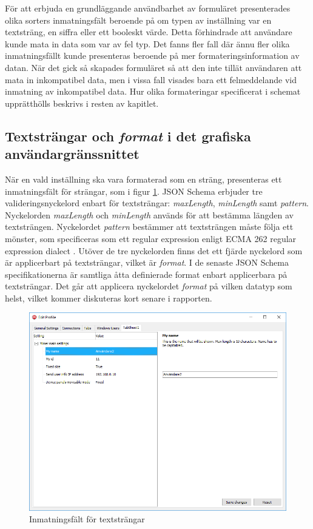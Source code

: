 För att erbjuda en grundläggande användbarhet av formuläret presenterades olika sorters inmatningsfält beroende på om typen av inställning var en textsträng, en siffra eller ett booleskt värde. Detta förhindrade att användare kunde mata in data som var av fel typ. Det fanns fler fall där ännu fler olika inmatningsfällt kunde presenteras beroende på mer formateringsinformation av datan. När det gick så skapades formuläret så att den inte tillät användaren att mata in inkompatibel data, men i vissa fall visades bara ett felmeddelande vid inmatning av inkompatibel data. Hur olika formateringar specificerat i schemat upprätthölls beskrivs i resten av kapitlet.

\subsection{Textsträngar och \textit{format} i det grafiska användargränssnittet}

När en vald inställning ska vara formaterad som en sträng, presenteras ett inmatningsfält för strängar, som i figur \ref{fig:textstrang}. JSON Schema erbjuder tre valideringsnyckelord enbart för textsträngar: \textit{maxLength}, \textit{minLength} samt \textit{pattern}. Nyckelorden \textit{maxLength} och \textit{minLength} används för att bestämma längden av textsträngen. Nyckelordet \textit{pattern} bestämmer att textsträngen måste följa ett mönster, som specificeras som ett regular expression enligt ECMA 262 regular expression dialect \cite{EcmaInternational2017}. Utöver de tre nyckelorden finns det ett fjärde nyckelord som är applicerbart på textsträngar, vilket är \textit{format}. I de senaste JSON Schema specifikationerna är samtliga åtta definierade format enbart applicerbara på textsträngar. Det går att applicera nyckelordet \textit{format} på vilken datatyp som helst, vilket kommer diskuteras kort senare i rapporten. \cite[s.~7-8,~14-15]{Andrews}

\begin{figure}
	\includegraphics[width=\textwidth]{./images/gui/textstrang.png}
	\vspace{-1.7em}
	\caption{Inmatningsfält för textsträngar}
	\label{fig:textstrang}
\end{figure}

